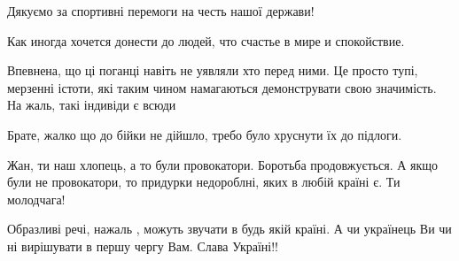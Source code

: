 \begin{itemize}
Дякуємо за спортивні перемоги на честь нашої держави!


 

Как иногда хочется донести до людей, что счастье в мире и спокойствие.


 

Впевнена, що ці поганці навіть не уявляли хто перед ними. Це просто тупі,
мерзенні істоти, які таким чином намагаються демонструвати свою значимість. На
жаль, такі індивіди є всюди


 

Брате, жалко що до бійки не дійшло, требо було хруснути їх до підлоги.

 

Жан, ти наш хлопець, а то були провокатори. Боротьба продовжується. А якщо були
не провокатори, то придурки недороблні, яких в любій країні є. Ти молодчага!


 

Образливі речі, нажаль , можуть звучати в будь якій країні. А чи українець Ви
чи ні вирішувати в першу чергу Вам. Слава Україні!!


 


\end{itemize}
